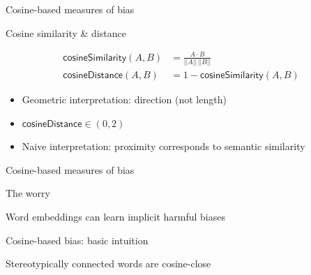 \documentclass[10pt,ignorenonframetext,x11names, dvipsnames, bibspacing,natbib]{beamer}
\begin{document}
\begin{frame}{Cosine-based measures of bias}
\protect\hypertarget{cosine-based-measures-of-bias-1}{}

\begin{block}{Cosine similarity \& distance}

\vspace{-4mm}

\begin{align} \tag{Sim}
\mathsf{cosineSimilarity}(A,B) & = \frac{A \cdot B}{\vert \vert A \vert \vert \,\vert \vert B \vert \vert}
\\
\tag{Distance}
\mathsf{cosineDistance}(A,B) &  = 1 - \mathsf{cosineSimilarity}(A,B)
\end{align}

\begin{itemize}
\item
  Geometric interpretation: direction (not length)
\item
  \(\mathsf{cosineDistance}\in (0, 2)\)
\item
  Naive interpretation: proximity corresponds to semantic similarity
\end{itemize}

\end{block}

\end{frame}

\begin{frame}{Cosine-based measures of bias}
\protect\hypertarget{cosine-based-measures-of-bias-2}{}

\begin{block}{The worry}

Word embeddings can learn implicit harmful biases

\pause

\end{block}

\begin{block}{Cosine-based bias: basic intuition}

Stereotypically connected words are cosine-close

\end{block}

\end{frame}
\end{document}
